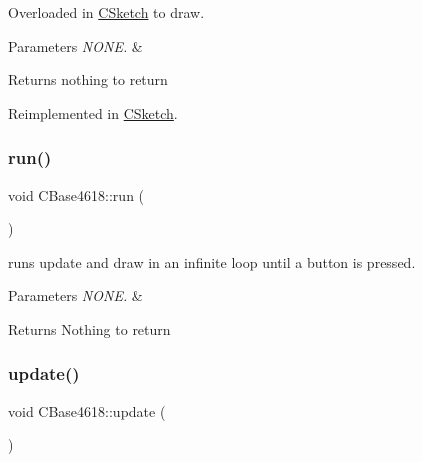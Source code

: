 Overloaded in \hyperlink{class_c_sketch}{C\+Sketch} to draw. 


\begin{DoxyParams}{Parameters}
{\em N\+O\+N\+E.} & \\
\hline
\end{DoxyParams}
\begin{DoxyReturn}{Returns}
nothing to return 
\end{DoxyReturn}


Reimplemented in \hyperlink{class_c_sketch_a9db432ca87bbd8c8dfc0b38f274640f6}{C\+Sketch}.

\hypertarget{class_c_base4618_a535e816d735d10d6048dd39cd893d393}{}\label{class_c_base4618_a535e816d735d10d6048dd39cd893d393} 
\subsubsection{\texorpdfstring{run()}{run()}}
{\footnotesize\ttfamily void C\+Base4618\+::run (\begin{DoxyParamCaption}{ }\end{DoxyParamCaption})\hspace{0.3cm}{\ttfamily [virtual]}}



runs update and draw in an infinite loop until a button is pressed. 


\begin{DoxyParams}{Parameters}
{\em N\+O\+N\+E.} & \\
\hline
\end{DoxyParams}
\begin{DoxyReturn}{Returns}
Nothing to return 
\end{DoxyReturn}
\hypertarget{class_c_base4618_ae1ac81eaa56ded6600262c361f723cb8}{}\label{class_c_base4618_ae1ac81eaa56ded6600262c361f723cb8} 
\subsubsection{\texorpdfstring{update()}{update()}}
{\footnotesize\ttfamily void C\+Base4618\+::update (\begin{DoxyParamCaption}{ }\end{DoxyParamCaption})\hspace{0.3cm}{\ttfamily [virtual]}}




